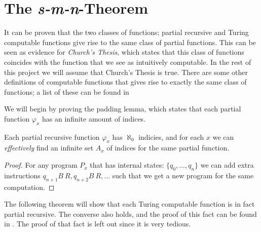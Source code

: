 \documentclass[../main.tex]{subfiles}
\begin{document}
\section{The \textit{s-m-n}-Theorem}

It can be proven that the two classes of functions; partial recursive and Turing
computable functions give rise to the same class of partial functions. This
can be seen as evidence for \textit{Church's Thesis}, which states that this
class of functions coincides with the function that we see as intuitively
computable. In the rest of this project we will assume that Church's Thesis
is true. There are some other definitions of computable functions that gives
rise to exactly the same class of functions; a list of these can be found in
\citet{Cutland1980}

We will begin by proving the padding lemma, which states that each partial
function $\varphi_x$ has an infinite amount of indices.
\begin{lem}
	Each partial recursive function $\varphi_x$ has $\aleph_0$ indicies,
	and for each $x$ we can \textit{effectively} find an infinite set $A_x$
	of indices for the same partial function.
\end{lem}
\begin{proof}
	For any program $P_x$ that has internal states: $\{q_0,\ldots, q_n\}$
	we can add extra instructions $q_{n+1}B\ R ,q_{n+2}B\ R,\ldots$ such
	that we get a new program for the same computation.
\end{proof}

The following theorem will show that each Turing computable function is in fact
partial recursive. The converse also holds, and the proof of this fact can be
found in \citet{Kleene1952}. The proof of that fact is left out since it is
very tedious.
\end{document}
